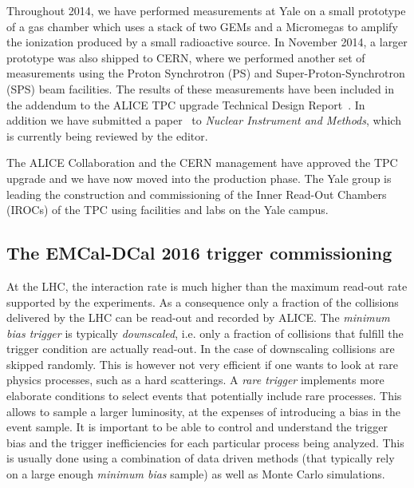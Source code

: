 \documentclass[12pt, a4paper, twoside, titlepage]{article}
\begin{document}
Throughout 2014, we have performed measurements at Yale on a small prototype of a gas chamber which uses a stack of two GEMs and a Micromegas to amplify the ionization
produced by a small radioactive source. In November 2014, a larger prototype was also shipped to CERN, where we performed another set of measurements using
the Proton Synchrotron (PS) and Super-Proton-Synchrotron (SPS) beam facilities.
The results of these measurements have been included in the addendum to the ALICE TPC upgrade Technical Design Report~\cite{}.
In addition we have submitted a paper~\cite{} to \emph{Nuclear Instrument and Methods}, which is currently being reviewed by the editor.

The ALICE Collaboration and the CERN management have approved the TPC upgrade and we have now moved into the production phase.
The Yale group is leading the construction and commissioning of the Inner Read-Out Chambers (IROCs) of the TPC using facilities and labs on the Yale campus.

\subsection{The EMCal-DCal 2016 trigger commissioning}
\label{sect:TriggerCommisioning}
At the LHC, the interaction rate is much higher than the maximum read-out rate supported by the experiments. As a consequence only a fraction of the collisions delivered
by the LHC can be read-out and recorded by ALICE. The \emph{minimum bias trigger} is typically \emph{downscaled}, i.e. only a fraction of collisions
that fulfill the trigger condition are actually read-out. In the case of downscaling collisions are skipped randomly. This is however not very efficient
if one wants to look at rare physics processes, such as a hard scatterings. A \emph{rare trigger} implements more elaborate conditions to select events that 
potentially include rare processes. This allows to sample a larger luminosity, at the expenses of introducing a bias in the event sample. It is important
to be able to control and understand the trigger bias and the trigger inefficiencies for each particular process being analyzed. This is usually done
using a combination of data driven methods (that typically rely on a large enough \emph{minimum bias} sample) as well as Monte Carlo simulations.
\end{document}
